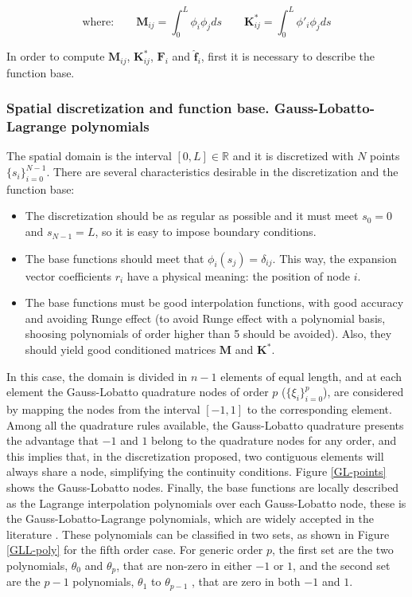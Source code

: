 \documentclass[10pt] {article}
\begin{document}
\begin{equation}
\text{where:}\qquad \mathbf{M}_{ij} = \int_0^L \phi_i\phi_j ds \qquad \mathbf{K}^*_{ij} =  \int_0^L \phi'_i\phi_j ds
\label{matrices-integrals}
\end{equation}

In order to compute $\mathbf{M}_{ij}$, $\mathbf{K}^*_{ij}$, $\mathbf{F}_i$ and $\hat{\mathbf{f}}_i$, first it is necessary to describe the function base.


\subsubsection{Spatial discretization and function base. Gauss-Lobatto-Lagrange polynomials}

The spatial domain is the interval $[0, L]\in\mathbb{R}$ and it is discretized with $N$ points $\{s_{i}\}_{i=0}^{N-1}$. There are several characteristics desirable in the discretization and the function base:

\begin{itemize}
    \item The discretization should be as regular as possible and it must meet $s_0 = 0$ and $s_{N-1} = L$, so it is easy to impose boundary conditions.
    \item The base functions should meet that $\phi_i(s_j) = \delta_{ij}$. This way, the expansion vector coefficients $r_i$ have a physical meaning: the position of node $i$.
    \item The base functions must be good interpolation functions, with good accuracy and avoiding Runge effect (to avoid Runge effect with a polynomial basis, shoosing polynomials of order higher than 5 should be avoided). Also, they should yield good conditioned matrices $\mathbf{M}$ and $\mathbf{K}^*$.
\end{itemize}

In this case, the domain is divided in $n-1$ elements of equal length, and at each element the Gauss-Lobatto quadrature nodes of order $p$ ($\{\xi_i\}_{i=0}^{p}$), are considered by mapping the nodes from the interval $[-1,1]$ to the corresponding element. Among all the quadrature rules available, the Gauss-Lobatto quadrature presents the advantage that $-1$ and $1$ belong to the quadrature nodes for any order, and this implies that, in the discretization proposed, two contiguous elements will always share a node, simplifying the continuity conditions. Figure \ref{GL-points} shows the Gauss-Lobatto nodes. Finally, the base functions are locally described as the Lagrange interpolation polynomials over each Gauss-Lobatto node, these is the Gauss-Lobatto-Lagrange polynomials, which are widely accepted in the literature \cite{karniadakis}. These polynomials can be classified in two sets, as shown in Figure \ref{GLL-poly} for the fifth order case. For generic order $p$, the first set are the two polynomials, $\theta_0$ and $\theta_p$, that are non-zero in either $-1$ or $1$, and the second set are the $p-1$ polynomials, $\theta_1$ to $\theta_{p-1}$ , that are zero in both $-1$ and $1$.\\
\end{document}
